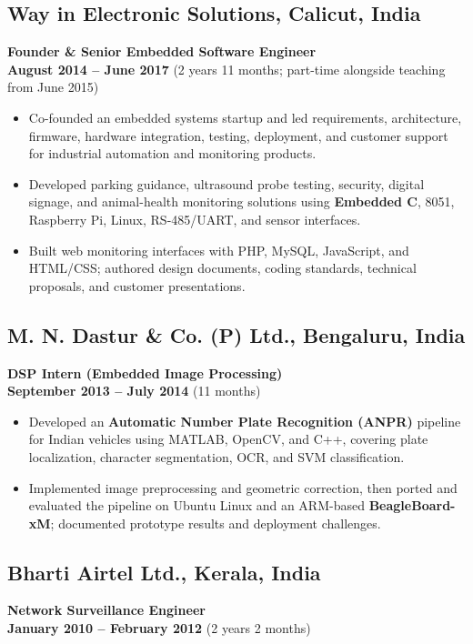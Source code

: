 \documentclass[a4paper,10pt]{article}
\begin{document}
\subsection{Way in Electronic Solutions, Calicut, India}
\textbf{Founder \& Senior Embedded Software Engineer} \\
\hfill \textbf{August 2014 -- June 2017} (2 years 11 months; part-time alongside teaching from June 2015)

\begin{itemize}
\item Co-founded an embedded systems startup and led requirements, architecture, firmware, hardware integration, testing, deployment, and customer support for industrial automation and monitoring products.

\item Developed parking guidance, ultrasound probe testing, security, digital signage, and animal-health monitoring solutions using \textbf{Embedded C}, 8051, Raspberry Pi, Linux, RS-485/UART, and sensor interfaces.

\item Built web monitoring interfaces with PHP, MySQL, JavaScript, and HTML/CSS; authored design documents, coding standards, technical proposals, and customer presentations.
\end{itemize}

\subsection{M. N. Dastur \& Co. (P) Ltd., Bengaluru, India}
\textbf{DSP Intern (Embedded Image Processing)} \\
\hfill \textbf{September 2013 -- July 2014} (11 months)

\begin{itemize}
\item Developed an \textbf{Automatic Number Plate Recognition (ANPR)} pipeline for Indian vehicles using MATLAB, OpenCV, and C++, covering plate localization, character segmentation, OCR, and SVM classification.

\item Implemented image preprocessing and geometric correction, then ported and evaluated the pipeline on Ubuntu Linux and an ARM-based \textbf{BeagleBoard-xM}; documented prototype results and deployment challenges.
\end{itemize}


\subsection{Bharti Airtel Ltd., Kerala, India}
\textbf{Network Surveillance Engineer} \\
\hfill \textbf{January 2010 -- February 2012}  (2 years 2 months)
\end{document}
